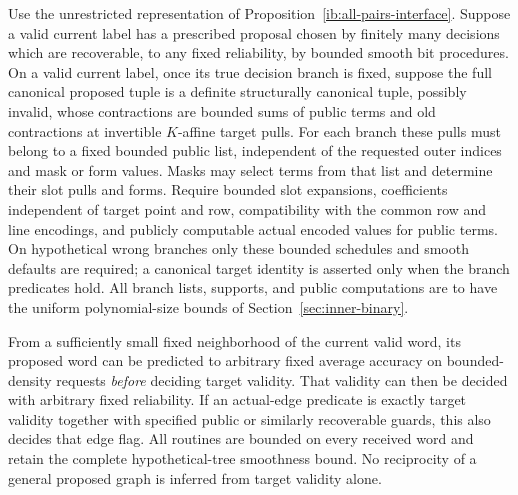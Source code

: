 \begin{proposition}
\label{ib:proposal-validation}
Use the unrestricted representation of
Proposition~\ref{ib:all-pairs-interface}. Suppose a valid current
label has a prescribed proposal chosen by finitely many decisions
which are recoverable, to any fixed reliability, by bounded smooth
bit procedures. On a valid current label, once its true decision
branch is fixed, suppose the full canonical proposed tuple is a
definite structurally canonical tuple, possibly invalid, whose
contractions are bounded sums of public terms and old contractions
at invertible \(K\)-affine target pulls. For each branch these pulls
must belong to a fixed bounded public list, independent of the
requested outer indices and mask or form values. Masks may select
terms from that list and determine their slot pulls and forms.
Require bounded slot expansions, coefficients independent of target
point and row, compatibility with the common row and line encodings,
and publicly computable actual encoded values for public terms.
On hypothetical wrong branches only these bounded schedules and
smooth defaults are required; a canonical target identity is asserted
only when the branch predicates hold.
All branch lists, supports, and public computations are to have the
uniform polynomial-size bounds of Section~\ref{sec:inner-binary}.

From a sufficiently small fixed neighborhood of the current valid
word, its proposed word can be predicted to arbitrary fixed average
accuracy on bounded-density requests \emph{before} deciding target
validity. That validity can then be decided with arbitrary fixed
reliability. If an actual-edge predicate is exactly target validity
together with specified public or similarly recoverable guards,
this also decides that edge flag. All routines are bounded on every
received word and retain the complete hypothetical-tree smoothness
bound. No reciprocity of a general proposed graph is inferred from
target validity alone.
\end{proposition}

